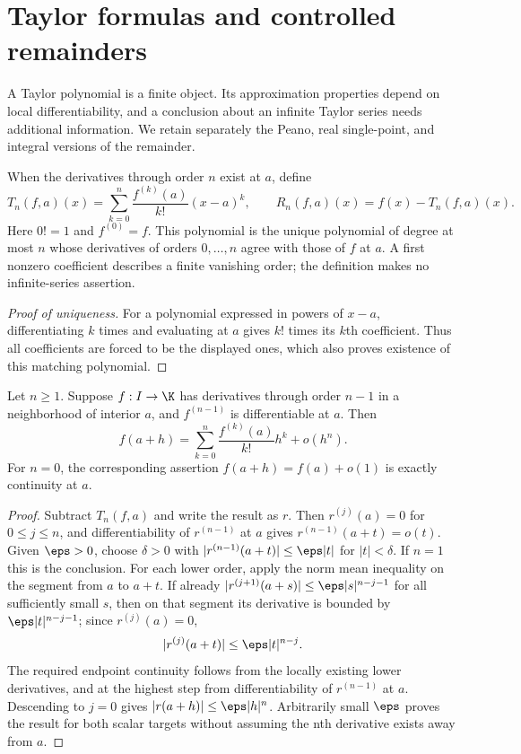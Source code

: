 \chapter{Taylor formulas and controlled remainders}
A Taylor polynomial is a finite object. Its approximation properties depend on local differentiability, and a conclusion about an infinite Taylor series needs additional information. We retain separately the Peano, real single-point, and integral versions of the remainder.

\begin{definition}
When the derivatives through order $n$ exist at $a$, define
\[ T_n(f,a)(x)=\sum_{k=0}^n\frac{f^{(k)}(a)}{k!}(x-a)^k,\qquad R_n(f,a)(x)=f(x)-T_n(f,a)(x). \]
Here $0!=1$ and $f^{(0)}=f$. This polynomial is the unique polynomial of degree at most $n$ whose derivatives of orders $0,\ldots,n$ agree with those of $f$ at $a$. A first nonzero coefficient describes a finite vanishing order; the definition makes no infinite-series assertion.
\end{definition}
\begin{proof}[Proof of uniqueness]
For a polynomial expressed in powers of $x-a$, differentiating $k$ times and evaluating at $a$ gives $k!$ times its $k$th coefficient. Thus all coefficients are forced to be the displayed ones, which also proves existence of this matching polynomial.
\end{proof}

\begin{theorem}
Let $n\ge1$. Suppose $f:I\to\K$ has derivatives through order $n-1$ in a neighborhood of interior $a$, and $f^{(n-1)}$ is differentiable at $a$. Then
\[ f(a+h)=\sum_{k=0}^n\frac{f^{(k)}(a)}{k!}h^k+o(h^n). \]
For $n=0$, the corresponding assertion $f(a+h)=f(a)+o(1)$ is exactly continuity at $a$.
\end{theorem}
\begin{proof}
Subtract $T_n(f,a)$ and write the result as $r$. Then $r^{(j)}(a)=0$ for $0\le j\le n$, and differentiability of $r^{(n-1)}$ at $a$ gives $r^{(n-1)}(a+t)=o(t)$. Given $\eps>0$, choose $\delta>0$ with $|r^{(n-1)}(a+t)|\le\eps|t|$ for $|t|<\delta$. If $n=1$ this is the conclusion. For each lower order, apply the norm mean inequality on the segment from $a$ to $a+t$. If already $|r^{(j+1)}(a+s)|\le\eps|s|^{n-j-1}$ for all sufficiently small $s$, then on that segment its derivative is bounded by $\eps|t|^{n-j-1}$; since $r^{(j)}(a)=0$,
\[ |r^{(j)}(a+t)|\le\eps|t|^{n-j}. \]
The required endpoint continuity follows from the locally existing lower derivatives, and at the highest step from differentiability of $r^{(n-1)}$ at $a$. Descending to $j=0$ gives $|r(a+h)|\le\eps|h|^n$. Arbitrarily small $\eps$ proves the result for both scalar targets without assuming the nth derivative exists away from $a$.
\end{proof}

